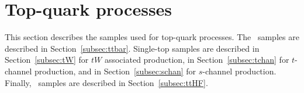\section{Top-quark processes}

This section describes the samples used for top-quark processes.
The \ttbar\ samples are described in Section~\ref{subsec:ttbar}.
Single-top samples are described in Section~\ref{subsec:tW} for $tW$ associated production,
in Section~\ref{subsec:tchan} for $t$-channel production,
and in Section~\ref{subsec:schan} for $s$-channel production.
Finally, \ttHF\ samples are described in Section~\ref{subsec:ttHF}.





